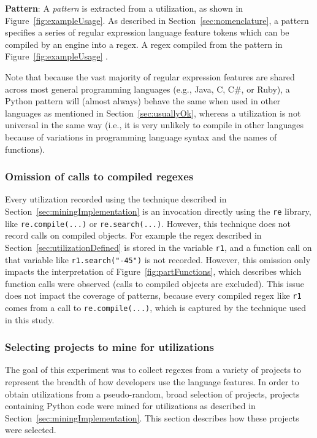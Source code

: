 \noindent \textbf{Pattern}: A \emph{pattern} is extracted from a utilization, as shown in Figure~\ref{fig:exampleUsage}. As described in Section~\ref{sec:nomenclature}, a pattern specifies a series of regular expression language feature tokens which can be compiled by an engine into a regex.  A regex compiled from the pattern in Figure~\ref{fig:exampleUsage} .

Note that because the vast majority of regular expression features are shared across most general programming languages (e.g., Java, C, C\#, or Ruby), a Python pattern will (almost always) behave the same when used in other languages as mentioned in Section~\ref{sec:usuallyOk}, whereas a utilization is not universal in the same way (i.e., it is very unlikely to compile in other languages because of variations in programming language syntax and the names of functions).

\subsubsection{Omission of calls to compiled regexes}
Every utilization recorded using the technique described in Section~\ref{sec:miningImplementation} is an invocation directly using the {\tt re} library, like {\tt re.compile(...)} or {\tt re.search(...)}.  However, this technique does not record calls on compiled objects.  For example the regex described in Section~\ref{sec:utilizationDefined} is stored in the variable {\tt r1}, and a function call on that variable like {\tt r1.search("-45")} is not recorded.  However, this omission only impacts the interpretation of Figure~\ref{fig:partFunctions}, which describes which function calls were observed (calls to compiled objects are excluded).  This issue does not impact the coverage of patterns, because every compiled regex like {\tt r1} comes from a call to {\tt re.compile(...)}, which is captured by the technique used in this study.

\subsubsection{Selecting projects to mine for utilizations}
\label{sec:selectingProjects}

The goal of this experiment was to collect regexes from a variety of projects to represent the breadth of how developers use the language features.  In order to obtain utilizations from a pseudo-random, broad selection of projects,  projects containing Python code were mined for utilizations as described in Section~\ref{sec:miningImplementation}.  This section describes how these projects were selected.

